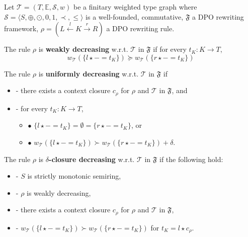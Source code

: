 \begin{definition}
    \label{def:decreasing_rule}
    Let $\mathcal{T} = (T,\mathbb{E},\mathcal{S}, w)$ be a finitary weighted type graph where $\mathcal{S}=\langle S, \oplus, \odot, 0, 1, \prec, \leq \rangle$ is a well-founded, commutative, \(\mathfrak{F}\) a DPO rewriting framework, $\rho = (L \overset{l}{\leftarrow} K \overset{r}{\rightarrow} R)$ a DPO rewriting rule. 

    \noindent
    The rule $\rho$ is \textbf{weakly decreasing} w.r.t. $\mathcal{T}$ in $\mathfrak{F}$ if 
            for every $t_K : K \to T$,
                $$ 
                  w_\mathcal{T}(\{l \star - = t_K\}) \succeq w_\mathcal{T}(\{r\star - = t_K\})$$
           
    \noindent
    The rule $\rho$ is \textbf{uniformly decreasing} w.r.t. $\mathcal{T}$ in $\mathfrak{F}$ if
        \begin{itemize}
            \item[]- there exists a context closure $c_\rho$ for $\rho$ and $\mathcal{T}$ in $\mathfrak{F}$, and
            \item[]- for every $t_K : K \to T$,
            \begin{itemize}
                \item[] $\bullet$ $\{l \star - = t_K\} = \emptyset = \{r \star - = t_K\}$, or
                \item[] $\bullet$ $w_\mathcal{T}(\{l \star - = t_K\}) \succ    w_\mathcal{T}(\{r \star - = t_K\}) + \delta$.
            \end{itemize}
        \end{itemize}  
         
    \noindent
    The rule $\rho$ is
            \textbf{$\delta$-closure decreasing} w.r.t. $\mathcal{T}$ in $\mathfrak{F}$ if the following hold:
            \begin{itemize}
                \item[]- $S$ is strictly monotonic semiring,
                \item[]- $\rho$ is weakly decreasing,
                \item[]- there exists a context closure $c_\rho$ for $\rho$ and $\mathcal{T}$ in $\mathfrak{F}$,
                \item[]- $w_\mathcal{T}(\{l \star - = t_K\}) \succ  w_\mathcal{T}(\{r \star - = t_K\})$ for $t_K = l \star c_\rho$.
            \end{itemize}
\end{definition}

